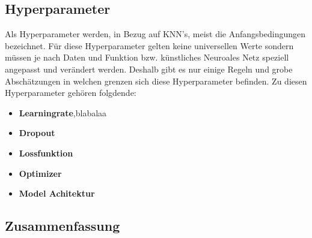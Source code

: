 \subsection{Hyperparameter}
Als Hyperparameter werden, in Bezug auf KNN's, meist die Anfangsbedingungen bezeichnet.
Für diese Hyperparameter gelten keine universellen Werte sondern müssen je nach Daten und Funktion bzw. künstliches Neuroales Netz speziell angepasst und verändert werden. Deshalb gibt es nur einige Regeln und grobe Abschätzungen in welchen grenzen sich diese Hyperparameter befinden. Zu diesen Hyperparameter gehören folgdende:
\begin{itemize}
\item \textbf{Learningrate},blabalaa
\item \textbf{Dropout}
\item \textbf{Lossfunktion}
\item \textbf{Optimizer}
\item \textbf{Model Achitektur}
\end{itemize}

\subsection{Zusammenfassung}

